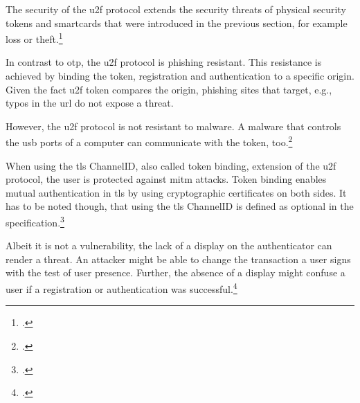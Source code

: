 The security of the \gls{u2f} protocol extends the security threats of physical security tokens and smartcards that were introduced in the previous section, for example loss or theft.\footcites[See][12--13]{fido-sec-ref}

In contrast to \gls{otp}, the \gls{u2f} protocol is phishing resistant. This resistance is achieved by binding the token, registration and authentication to a specific origin. Given the fact \gls{u2f} token compares the origin, phishing sites that target, e.g., typos in the \gls{url} do not expose a threat.

However, the \gls{u2f} protocol is not resistant to malware. A malware that controls the \gls{usb} ports of a computer can communicate with the token, too.\footcites[See][10--1]{8429292}[See][9]{u2f-overview}

When using the \gls{tls} ChannelID, also called token binding, extension of the \gls{u2f} protocol, the user is protected against \gls{mitm} attacks. Token binding enables mutual authentication in \gls{tls} by using cryptographic certificates on both sides. It has to be noted though, that using the \gls{tls} ChannelID is defined as optional in the specification.\footcites[See][6--7]{u2f-overview}

Albeit it is not a vulnerability, the lack of a display on the authenticator can render a threat. An attacker might be able to change the transaction a user signs with the test of user presence. Further, the absence of a display might confuse a user if a registration or authentication was successful.\footcites[See][434]{10.1007/978-3-662-54970-4_25}[See][15]{das2018johnny}